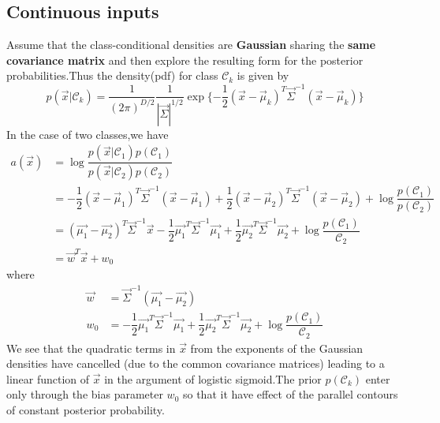 \subsection{Continuous inputs}
Assume that the class-conditional densities are \textbf{Gaussian} sharing the \textbf{same covariance matrix} and then explore the resulting form for the posterior probabilities.Thus the density(pdf) for class $\mathcal{C}_k$ is given by
\begin{equation}
p(\vec{x}|\mathcal{C}_k) = \dfrac{1}{(2\pi)^{D/2}}\dfrac{1}{|\vec{\Sigma}|^{1/2}}
\exp\{-\dfrac{1}{2}(\vec{x}-\vec{\mu}_k)^T\vec{\Sigma}^{-1}(\vec{x}-\vec{\mu}_k)  \}
\end{equation}
In the case of two classes,we have
\begin{align}
a(\vec{x}) &= \log\dfrac{p(\vec{x}|\mathcal{C}_1)p(\mathcal{C}_1)}
{p(\vec{x}|\mathcal{C}_2)p(\mathcal{C}_2)} \\
&=-\dfrac{1}{2}(\vec{x}-\vec{\mu}_1)^T\vec{\Sigma}^{-1}(\vec{x}-\vec{\mu}_1) +
\dfrac{1}{2}(\vec{x}-\vec{\mu}_2)^T\vec{\Sigma}^{-1}(\vec{x}-\vec{\mu}_2) + \log\dfrac{p(\mathcal{C}_1)}{p(\mathcal{C}_2)} \\
&=(\vec{\mu_1}-\vec{\mu_2})^T\vec{\Sigma}^{-1}\vec{x}-
\dfrac{1}{2}\vec{\mu_1}^T\vec{\Sigma}^{-1}\vec{\mu_1} +
\dfrac{1}{2}\vec{\mu_2}^T\vec{\Sigma}^{-1}\vec{\mu_2} + \log\dfrac{p(\mathcal{C}_1)}{\mathcal{C}_2} \\
&=\vec{w}^T\vec{x}+w_0
\end{align}
where
\begin{align}
\vec{w} &= \vec{\Sigma}^{-1}(\vec{\mu_1}-\vec{\mu_2}) \\
w_0 &=  -\dfrac{1}{2}\vec{\mu_1}^T\vec{\Sigma}^{-1}\vec{\mu_1} +
\dfrac{1}{2}\vec{\mu_2}^T\vec{\Sigma}^{-1}\vec{\mu_2} + \log\dfrac{p(\mathcal{C}_1)}{\mathcal{C}_2}
\end{align}
We see that the quadratic terms in $\vec{x}$ from the exponents of the Gaussian densities have cancelled (due to the common covariance matrices) leading to a linear function of $\vec{x}$ in the argument of logistic sigmoid.The prior $p(\mathcal{C}_k)$ enter only through the bias parameter $w_0$ so that it have effect of the parallel contours of constant posterior probability.

